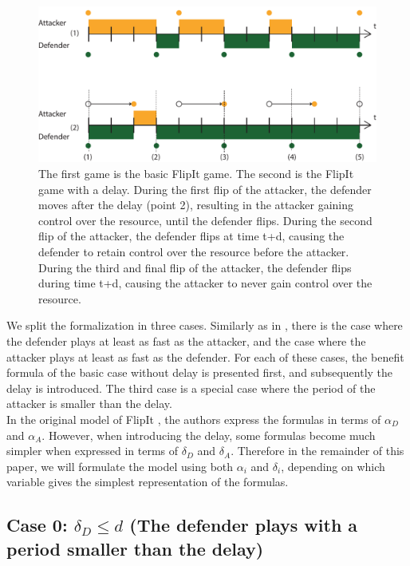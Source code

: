 \begin{figure}[hbtp]
\centering
\includegraphics[scale=0.7]{Images/Delayuitgelegd.pdf}
\caption{The first game is the basic FlipIt game. The second is the FlipIt game with a delay. During the first flip of the attacker, the defender moves after the delay (point 2), resulting in the attacker gaining control over the resource, until the defender flips. During the second flip of the attacker, the defender flips at time t+d, causing the defender to retain control over the resource before the attacker. During the third and final flip of the attacker, the defender flips during time t+d, causing the attacker to never gain control over the resource. }
\label{dt}
\end{figure}


%
We split the formalization in three cases. Similarly as in \cite{FlipIt}, there is the case where the defender plays at least as fast as the attacker, and the case where the attacker plays at least as fast as the defender. For each of these cases, the benefit formula of the basic case without delay is presented first, and subsequently the delay is introduced.  The third case is a special case where the period of the attacker is smaller than the delay.\\

In the original model of FlipIt \cite{FlipIt}, the authors express the formulas in terms of $\alpha_{D}$ and $\alpha_{A}$. However, when introducing the delay, some formulas become much simpler when expressed in terms of $\delta_{D}$ and $\delta_{A}$. Therefore in the remainder of this paper, we will formulate the model using both $\alpha_{i}$ and $\delta_{i}$, depending on which variable gives the simplest representation of the formulas.

\subsection*{Case 0: $\delta_{D} \leq d$ (The defender plays with a period smaller than the delay)}

